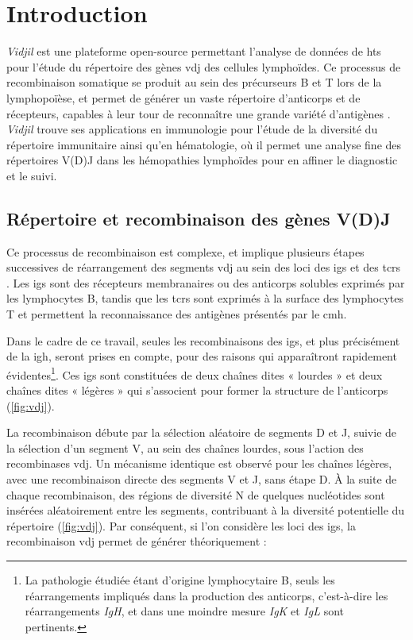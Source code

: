 \chapter{Introduction}

\textit{Vidjil} est une plateforme open-source
\cite{giraudFastMulticlonalClusterization2014b} permettant l'analyse de données
de \gls{hts} pour l'étude du répertoire des gènes \gls{vdj} des cellules
lymphoïdes. Ce processus de recombinaison somatique se produit au sein des
précurseurs B et T lors de la lymphopoïèse, et permet de générer un vaste
répertoire d'anticorps et de récepteurs, capables à leur tour de reconnaître une
grande variété d'antigènes \cite{jonesTamingTransposonVDJ2004}. \textit{Vidjil}
trouve ses applications en immunologie pour l'étude de la diversité du
répertoire immunitaire ainsi qu'en hématologie, où il permet une analyse fine
des répertoires V(D)J dans les hémopathies lymphoïdes pour en affiner le
diagnostic et le suivi.

\section{Répertoire et recombinaison des gènes V(D)J}

Ce processus de recombinaison est complexe, et implique plusieurs étapes
successives de réarrangement des segments \gls{vdj} au sein des loci des
\glspl{ig} et des \glspl{tcr} \cite{rothVDJRecombinationMechanism2014}. Les
\glspl{ig} sont des récepteurs membranaires ou des anticorps solubles exprimés
par les lymphocytes B, tandis que les \glspl{tcr} sont exprimés à la surface
des lymphocytes T et permettent la reconnaissance des antigènes présentés par
le \gls{cmh}.

Dans le cadre de ce travail, seules les recombinaisons des \glspl{ig}, et plus
précisément de la \gls{igh}, seront prises en compte,
pour des raisons qui apparaîtront rapidement évidentes\footnote{La pathologie
étudiée étant d'origine lymphocytaire B, seuls les réarrangements impliqués
dans la production des anticorps, c'est-à-dire les réarrangements \textit{IgH},
et dans une moindre mesure \textit{IgK} et \textit{IgL} sont pertinents.}. 
Ces \glspl{ig} sont constituées de deux chaînes dites « lourdes » et deux chaînes
 dites « légères » qui s'associent pour former la structure de l'anticorps (\autoref{fig:vdj}).

La recombinaison débute par la sélection aléatoire de segments D et J, suivie
de la sélection d'un segment V, au sein des chaînes lourdes, sous
l'action des recombinases \gls{vdj}. Un mécanisme identique est observé pour
les chaînes légères, avec une recombinaison directe des segments V et J,
sans étape D. À la suite de chaque recombinaison, des régions de diversité N de
quelques nucléotides sont insérées aléatoirement entre les segments,
contribuant à la diversité potentielle du répertoire (\autoref{fig:vdj}). Par
conséquent, si l'on considère les loci des \glspl{ig}, la recombinaison
\gls{vdj} permet de générer théoriquement :

